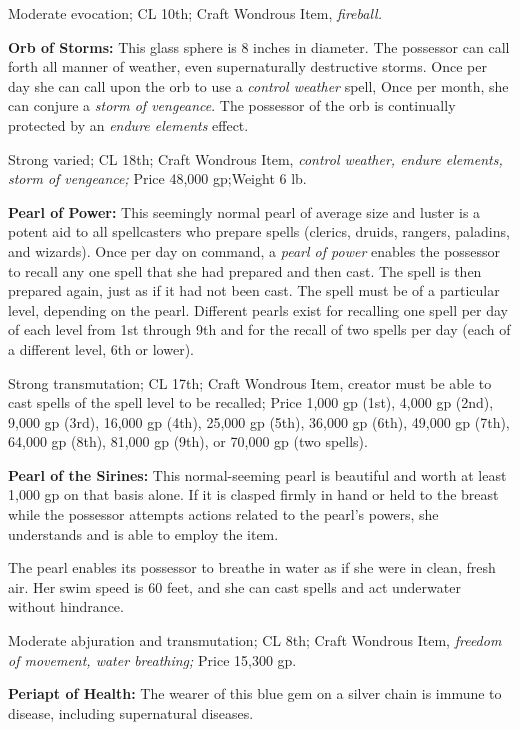 Moderate evocation; CL 10th; Craft Wondrous Item, \textit{fireball. }

\textbf{Orb of Storms:} This glass sphere is 8 inches in diameter. The possessor 
can call forth all manner of weather, even supernaturally destructive storms. Once 
per day she can call upon the orb to use a \textit{control weather }spell, Once 
per month, she can conjure a \textit{storm of vengeance}. The possessor of the 
orb is continually protected by an \textit{endure elements }effect.

Strong varied; CL 18th; Craft Wondrous Item, \textit{control weather, endure elements, 
storm of vengeance; }Price 48,000 gp;Weight 6 lb.

\textbf{Pearl of Power:} This seemingly normal pearl of average size and luster 
is a potent aid to all spellcasters who prepare spells (clerics, druids, rangers, 
paladins, and wizards). Once per day on command, a \textit{pearl of power }enables 
the possessor to recall any one spell that she had prepared and then cast. The 
spell is then prepared again, just as if it had not been cast. The spell must be 
of a particular level, depending on the pearl. Different pearls exist for recalling 
one spell per day of each level from 1st through 9th and for the recall of two 
spells per day (each of a different level, 6th or lower).

Strong transmutation; CL 17th; Craft Wondrous Item, creator must be able to cast 
spells of the spell level to be recalled; Price 1,000 gp (1st), 4,000 gp (2nd), 
9,000 gp (3rd), 16,000 gp (4th), 25,000 gp (5th), 36,000 gp (6th), 49,000 gp (7th), 
64,000 gp (8th), 81,000 gp (9th), or 70,000 gp (two spells).

\textbf{Pearl of the Sirines: }This normal-seeming pearl is beautiful and worth 
at least 1,000 gp on that basis alone. If it is clasped firmly in hand or held 
to the breast while the possessor attempts actions related to the pearl's powers, 
she understands and is able to employ the item.

The pearl enables its possessor to breathe in water as if she were in clean, fresh 
air. Her swim speed is 60 feet, and she can cast spells and act underwater without 
hindrance.

Moderate abjuration and transmutation; CL 8th; Craft Wondrous Item, \textit{freedom 
of movement, water breathing; }Price 15,300 gp.

\textbf{Periapt of Health:} The wearer of this blue gem on a silver chain is immune 
to disease, including supernatural diseases.

